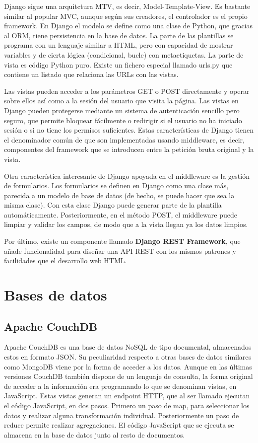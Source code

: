 \documentclass[12pt]{report} %
\begin{document}
Django sigue una arquitctura MTV, es decir, Model-Template-View. Es bastante similar al popular MVC, aunque según sus creadores, el controlador es el propio framework.
En Django el modelo se define como una clase de Python, que gracias al ORM, tiene persistencia en la base de datos. La parte de las plantillas se programa con un lenguaje similar a HTML, pero con capacidad de mostrar variables
y de cierta lógica (condicional, bucle) con metaetiquetas. La parte de vista es código Python puro. Existe un fichero especial llamado urls.py que contiene un listado que relaciona las URLs con las vistas.

Las vistas pueden acceder a los parámetros GET o POST directamente y operar sobre ellos así como a la sesión del usuario que visita la página.
Las vistas en Django pueden protegerse mediante un sistema de autenticación sencillo pero seguro, que permite bloquear fácilmente o redirigir si el usuario no ha iniciado sesión o si no tiene los permisos suficientes.
Estas características de Django tienen el denominador común de que son implementadas usando middleware, es decir, componentes del framework que se introducen entre la petición bruta original
y la vista.

Otra característica interesante de Django apoyada en el middleware es la gestión de formularios. Los formularios se definen en Django como una clase más, parecida a un modelo de base de datos (de hecho, se puede hacer que sea la misma clase).
Con esta clase Django puede generar parte de la plantilla automáticamente. Posteriormente, en el método POST, el middleware puede limpiar y validar los campos, de modo que a la vista llegan ya los datos limpios.

Por último, existe un componente llamado \textbf{Django REST Framework}, que añade funcionalidad para diseñar una API REST con los mismos patrones y facilidades que el desarrollo web HTML.

\section{Bases de datos}
\subsection{Apache CouchDB}
Apache CouchDB es una base de datos NoSQL de tipo documental, almacenados estos en formato JSON.\cite{couchdb}
Su peculiaridad respecto a otras bases de datos similares como MongoDB viene por la forma de acceder a los datos.
Aunque en las últimas versiones CouchDB también dispone de un lenguaje de consulta, la forma original de acceder a la información era programando lo que se denominan vistas, en JavaScript.
Estas vistas generan un endpoint HTTP, que al ser llamado ejecutan el código JavaScript, en dos pasos. Primero un paso de map, para seleccionar los datos y realizar alguna transformación individual.
Posteriormente un paso de reduce permite realizar agregaciones. El código JavaScript que se ejecuta se almacena en la base de datos junto al resto de documentos.
\end{document}
